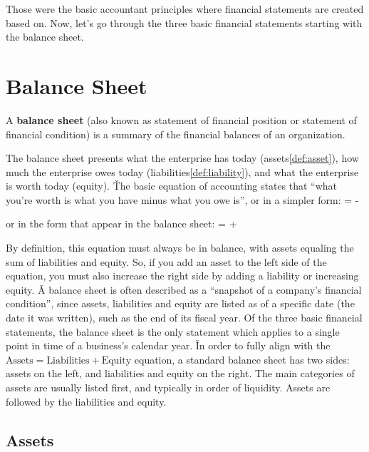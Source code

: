 Those were the basic accountant principles where financial statements are created based on. Now, let's go through the
three basic financial statements starting with the balance sheet.

\section{Balance Sheet}

A \textbf{balance sheet} (also known as statement of financial position or statement of financial condition) is a
summary of the financial balances of an organization.
\ed

The balance sheet presents what the enterprise has today (assets\ref{def:asset}), how much the enterprise owes today
(liabilities\ref{def:liability}), and what the enterprise is worth today (equity). \v

The basic equation of accounting states that ``what you're worth is what you have minus what you owe is'', or in a
simpler form:
\bse
{} =  - 
\ese

or in the form that appear in the balance sheet:
\bse
{} =  + 
\ese

By definition, this equation must always be in balance, with assets equaling the sum of liabilities and equity. So, if
you add an asset to the left side of the equation, you must also increase the right side by adding a liability or
increasing equity. \v

A balance sheet is often described as a ``snapshot of a company's financial condition'', since assets, liabilities
and equity are listed as of a specific date (the date it was written), such as the end of its fiscal year. Of the
three basic financial statements, the balance sheet is the only statement which applies to a single point in time of a
business's calendar year. \v

In order to fully align with the $\text{Assets} = \text{Liabilities} + \text{Equity}$ equation, a standard balance
sheet has two sides: assets on the left, and liabilities and equity on the right. The main categories of assets are
usually listed first, and typically in order of liquidity. Assets are followed by the liabilities and equity.

\subsection{Assets}

